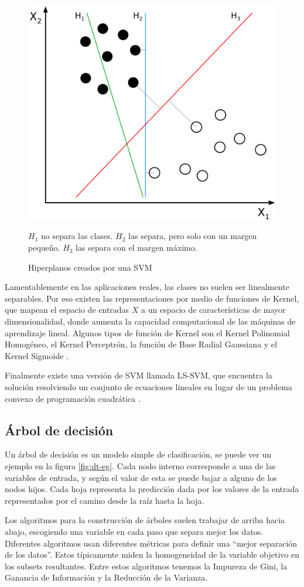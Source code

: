 \begin{figure}[htbp]
    \centering
    \includegraphics[width=0.4\linewidth]{graficos/svm_hiperplanos.png}
    \caption{Hiperplanos creados por una SVM \citep{wiki:svm_figure}}
    \label{fig:svm-hiperplanos}
    \par
    \small
    $H_1$ no separa las clases. $H_2$ las separa, pero solo con un margen pequeño. $H_3$ las separa con el margen máximo.
\end{figure}

Lamentablemente en las aplicaciones reales, las clases no suelen ser linealmente separables. Por eso existen las representaciones por medio de funciones de Kernel, que mapean el espacio de entradas $X$ a un espacio de características de mayor dimensionalidad, donde aumenta la capacidad computacional de las máquinas de aprendizaje lineal. Algunos tipos de función de Kernel son el Kernel Polinomial Homogéneo, el Kernel Perceptrón, la función de Base Radial Gaussiana y el Kernel Sigmoide \citep{cristianini2000introduction}.

Finalmente existe una versión de \ac{SVM} llamada \ac{LS-SVM}, que encuentra la solución resolviendo un conjunto de ecuaciones lineales en lugar de un problema convexo de programación cuadrática \citep{ak2002least}.

\subsection{Árbol de decisión}

Un árbol de decisión es un modelo simple de clasificación, se puede ver un ejemplo en la figura \ref{fig:dt-eg}. Cada nodo interno corresponde a una de las variables de entrada, y según el valor de esta se puede bajar a alguno de los nodos hijos. Cada hoja representa la predicción dada por los valores de la entrada representados por el camino desde la raíz hasta la hoja.

Los algoritmos para la construcción de árboles suelen trabajar de arriba hacia abajo, escogiendo una variable en cada paso que separa mejor los datos. Diferentes algoritmos usan diferentes métricas para definir una ``mejor separación de los datos''. Estos típicamente miden la homogeneidad de la variable objetivo en los subsets resultantes. Entre estos algoritmos tenemos la Impureza de Gini, la Ganancia de Información y la Reducción de la Varianza.

